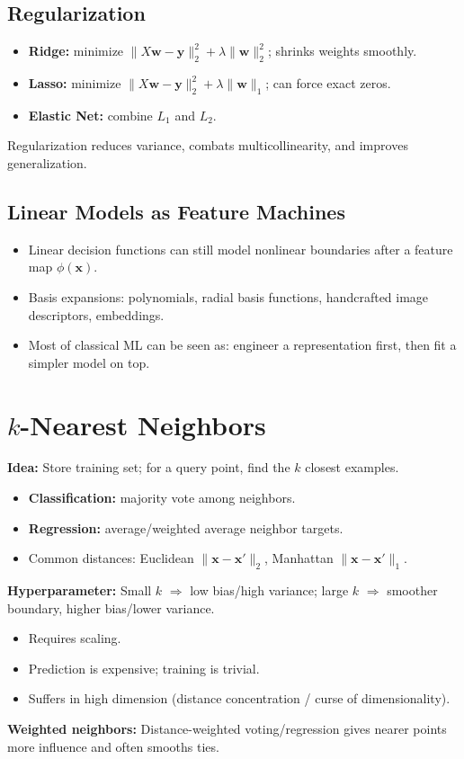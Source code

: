 \documentclass[10pt,twocolumn]{article}
\newcommand{\x}{\mathbf{x}}
\newcommand{\y}{\mathbf{y}}
\newcommand{\w}{\mathbf{w}}
\newcommand{\chead}[1]{\vspace{0.15em}\textbf{#1:} }
\begin{document}
\subsection{Regularization}
\begin{itemize}
  \item \textbf{Ridge:} minimize $\|X\w-\y\|_2^2 + \lambda\|\w\|_2^2$; shrinks weights smoothly.
  \item \textbf{Lasso:} minimize $\|X\w-\y\|_2^2 + \lambda\|\w\|_1$; can force exact zeros.
  \item \textbf{Elastic Net:} combine $L_1$ and $L_2$.
\end{itemize}
Regularization reduces variance, combats multicollinearity, and improves generalization.

\subsection{Linear Models as Feature Machines}
\begin{itemize}
  \item Linear decision functions can still model nonlinear boundaries after a feature map $\phi(\x)$.
  \item Basis expansions: polynomials, radial basis functions, handcrafted image descriptors, embeddings.
  \item Most of classical ML can be seen as: engineer a representation first, then fit a simpler model on top.
\end{itemize}

\section{$k$-Nearest Neighbors}
\chead{Idea} Store training set; for a query point, find the $k$ closest examples.
\begin{itemize}
  \item \textbf{Classification:} majority vote among neighbors.
  \item \textbf{Regression:} average/weighted average neighbor targets.
  \item Common distances: Euclidean $\|\x-\x'\|_2$, Manhattan $\|\x-\x'\|_1$.
\end{itemize}
\chead{Hyperparameter} Small $k$ $\Rightarrow$ low bias/high variance; large $k$ $\Rightarrow$ smoother boundary, higher bias/lower variance.
\begin{itemize}
  \item Requires scaling.
  \item Prediction is expensive; training is trivial.
  \item Suffers in high dimension (distance concentration / curse of dimensionality).
\end{itemize}
\chead{Weighted neighbors} Distance-weighted voting/regression gives nearer points more influence and often smooths ties.
\end{document}
